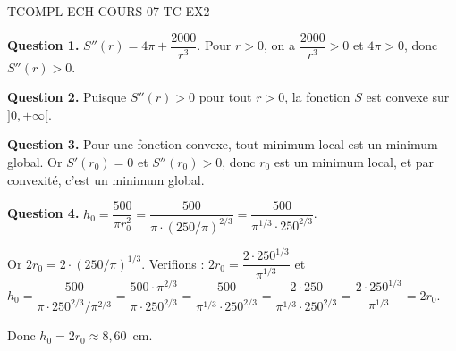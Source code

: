 \begin{corrige}{TCOMPL-ECH-COURS-07-TC-EX2}

\textbf{Question 1.} $S''(r) = 4\pi + \dfrac{2000}{r^3}$. Pour $r > 0$, on a $\dfrac{2000}{r^3} > 0$ et $4\pi > 0$, donc $S''(r) > 0$.

\textbf{Question 2.} Puisque $S''(r) > 0$ pour tout $r > 0$, la fonction $S$ est convexe sur $]0, +\infty[$.

\textbf{Question 3.} Pour une fonction convexe, tout minimum local est un minimum global. Or $S'(r_0) = 0$ et $S''(r_0) > 0$, donc $r_0$ est un minimum local, et par convexité, c'est un minimum global.

\textbf{Question 4.} $h_0 = \dfrac{500}{\pi r_0^2} = \dfrac{500}{\pi \cdot (250/\pi)^{2/3}} = \dfrac{500}{\pi^{1/3} \cdot 250^{2/3}}$.

Or $2r_0 = 2 \cdot (250/\pi)^{1/3}$. Verifions : $2r_0 = \dfrac{2 \cdot 250^{1/3}}{\pi^{1/3}}$ et $h_0 = \dfrac{500}{\pi \cdot 250^{2/3}/\pi^{2/3}} = \dfrac{500 \cdot \pi^{2/3}}{\pi \cdot 250^{2/3}} = \dfrac{500}{\pi^{1/3} \cdot 250^{2/3}} = \dfrac{2 \cdot 250}{\pi^{1/3} \cdot 250^{2/3}} = \dfrac{2 \cdot 250^{1/3}}{\pi^{1/3}} = 2r_0$.

Donc $h_0 = 2r_0 \approx 8{,}60$~cm.

\end{corrige}

